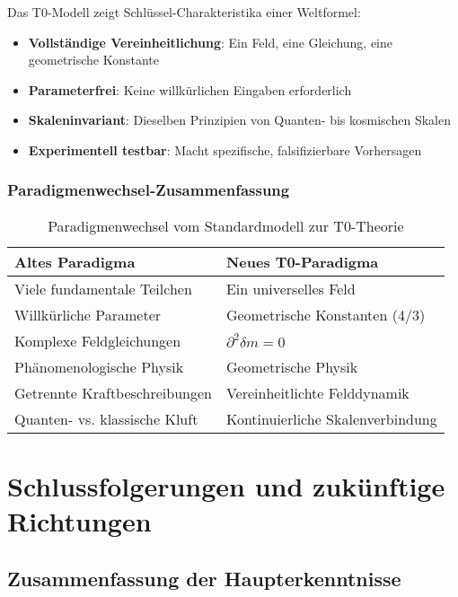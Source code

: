 \documentclass[12pt,a4paper]{article}
\newcommand{\deltafield}{\ensuremath{\delta m}}
\begin{document}
	Das T0-Modell zeigt Schlüssel-Charakteristika einer Weltformel:
	\begin{itemize}
		\item \textbf{Vollständige Vereinheitlichung}: Ein Feld, eine Gleichung, eine geometrische Konstante
		\item \textbf{Parameterfrei}: Keine willkürlichen Eingaben erforderlich
		\item \textbf{Skaleninvariant}: Dieselben Prinzipien von Quanten- bis kosmischen Skalen
		\item \textbf{Experimentell testbar}: Macht spezifische, falsifizierbare Vorhersagen
	\end{itemize}
	
	\subsubsection{Paradigmenwechsel-Zusammenfassung}
	\label{subsubsec:paradigmenwechsel}
	
	\begin{table}[htbp]
		\centering
		\begin{tabular}{ll}
			\toprule
			\textbf{Altes Paradigma} & \textbf{Neues T0-Paradigma} \\
			\midrule
			Viele fundamentale Teilchen & Ein universelles Feld \\
			Willkürliche Parameter & Geometrische Konstanten (4/3) \\
			Komplexe Feldgleichungen & $\partial^2\deltafield = 0$ \\
			Phänomenologische Physik & Geometrische Physik \\
			Getrennte Kraftbeschreibungen & Vereinheitlichte Felddynamik \\
			Quanten- vs. klassische Kluft & Kontinuierliche Skalenverbindung \\
			\bottomrule
		\end{tabular}
		\caption{Paradigmenwechsel vom Standardmodell zur T0-Theorie}
		\label{tab:paradigmenwechsel}
	\end{table}
	
	\section{Schlussfolgerungen und zukünftige Richtungen}
	\label{sec:schlussfolgerungen}
	
	\subsection{Zusammenfassung der Haupterkenntnisse}
	\label{subsec:haupterkenntnisse}
	
\end{document}
